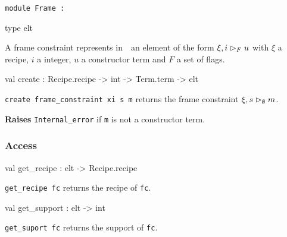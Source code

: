 \begin{ocamldoccode}
{\tt{module }}{\tt{Frame}}{\tt{ : }}\end{ocamldoccode}
\label{module:Constraint.Frame}

\begin{ocamldocsigend}


\label{type:Constraint.Frame.elt}\begin{ocamldoccode}
type elt 
\end{ocamldoccode}
\begin{ocamldocdescription}
A frame constraint represents in~\thesis~an element of the form $\xi, i \vartriangleright_F u$ with  
      $\xi$ a recipe, $i$ a integer, $u$ a constructor term and $F$ a set of flags. 


\end{ocamldocdescription}


\label{val:Constraint.Frame.create}\begin{ocamldoccode}
val create : Recipe.recipe -> int -> Term.term -> elt
\end{ocamldoccode}
\begin{ocamldocdescription}
{\tt{create frame\_constraint xi s m}} returns the frame constraint $\xi, s \vartriangleright_\emptyset m$. 

{\bf Raises} {\tt{Internal\_error}} if {\tt{m}} is not a constructor term. \highdebug 


\end{ocamldocdescription}


\subsubsection{Access}


\label{val:Constraint.Frame.get-underscorerecipe}\begin{ocamldoccode}
val get_recipe : elt -> Recipe.recipe
\end{ocamldoccode}
\begin{ocamldocdescription}
{\tt{get\_recipe fc}} returns the recipe of {\tt{fc}}.


\end{ocamldocdescription}


\label{val:Constraint.Frame.get-underscoresupport}\begin{ocamldoccode}
val get_support : elt -> int
\end{ocamldoccode}
\begin{ocamldocdescription}
{\tt{get\_suport fc}} returns the support of {\tt{fc}}.



\end{ocamldocdescription}
\end{ocamldocsigend}
